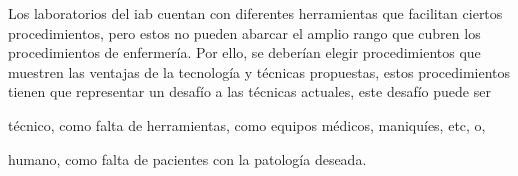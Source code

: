 \begin{itemize}
    Los laboratorios del \Gls{iab} cuentan con diferentes herramientas que
    facilitan ciertos procedimientos, pero estos no pueden abarcar el amplio
    rango que cubren los procedimientos de enfermería. Por ello, se deberían
    elegir procedimientos que muestren las ventajas de la tecnología y técnicas
    propuestas, estos procedimientos tienen que representar un desafío a las
    técnicas actuales, este desafío puede ser 
    \begin{enumerate*}[label=\itshape\alph*\upshape)]
    \item técnico, como falta de herramientas, como equipos médicos, maniquíes,
        etc, o,
    \item humano, como falta de pacientes con la patología deseada.
    \end{enumerate*}
    
\end{itemize}

